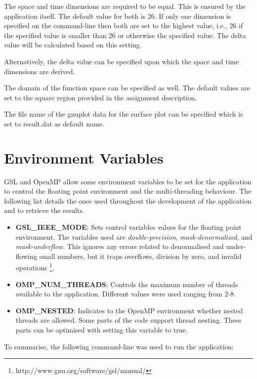 \documentclass[12pt,a4paper]{report}
\begin{document}
The space and time dimensions are required to be equal. This is
ensured by the application itself. The default value for both is
26. If only one dimension is specified on the command-line then both
are set to the highest value, i.e., 26 if the specified value is
smaller than 26 or otherwise the specified value. The delta value will
be calculated based on this setting.

Alternatively, the delta value can be specified upon which the space
and time dimensions are derived.

The domain of the function space can be specified as well. The default
values are set to the square region provided in the assignment
description.

The file name of the gnuplot data for the surface plot can be
specified which is set to result.dat as default name.

\section{Environment Variables}
\label{sec:envir-vari}

GSL and OpenMP allow some environment variables to be set for the
application to control the floating point environment and the
multi-threading behaviour. The following list details the ones used
throughout the development of the application and to retrieve the
results.

\begin{itemize}
\item \textbf{GSL\_IEEE\_MODE}: Sets control variables values for the
  floating point environment. The variables used are
  \textit{double-precision}, \textit{mask-denormalized}, and
  \textit{mask-underflow}. This ignores any errors related to
  denormalised and under-flowing small numbers, but it traps
  overflows, division by zero, and invalid operations
  \footnote{http://www.gnu.org/software/gsl/manual/}.
\item \textbf{OMP\_NUM\_THREADS}: Controls the maximum number of threads
  available to the application. Different values were used ranging
  from 2-8.
\item \textbf{OMP\_NESTED}: Indicates to the OpenMP environment whether
  nested threads are allowed. Some parts of the code support thread
  nesting. These parts can be optimised with setting this variable to
  true.
\end{itemize}

To summarise, the following command-line was used to run the
application:
\end{document}
